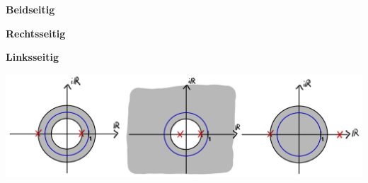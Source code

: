 \documentclass[11pt]{article}
\begin{document}
\vspace*{-0.5cm}
\begin{center}
    \begin{minipage}[c]{0.3\textwidth}
        \begin{flushright}
            \textbf{Beidseitig}
        \end{flushright}
    \end{minipage}
    \hfill
    \begin{minipage}[c]{0.25\textwidth}
        \begin{center}
            \textbf{Rechtsseitig}
        \end{center}
    \end{minipage}
    \hfill
    \begin{minipage}[c]{0.3\textwidth}
        \begin{flushleft}
            \textbf{Linksseitig}
        \end{flushleft}
    \end{minipage}
    
    \includegraphics[width=0.8\linewidth]{docimgs/BIBO_stabil.jpg}
\end{center}

\pagebreak
\end{document}

